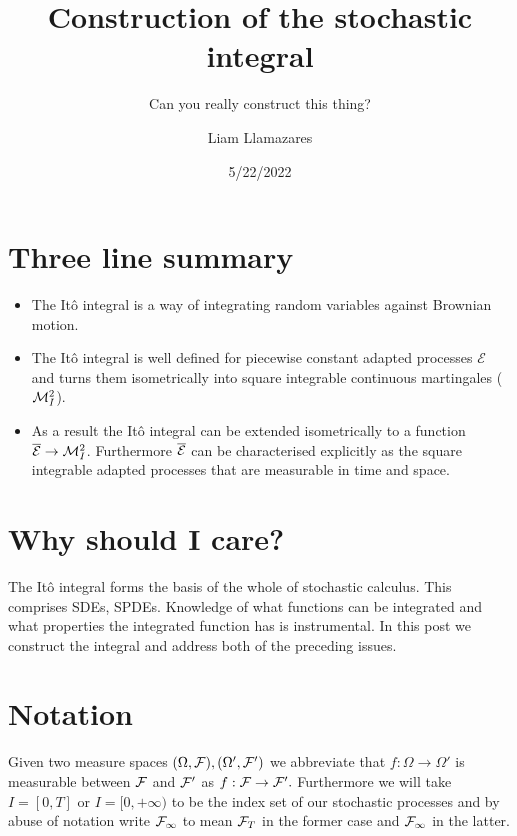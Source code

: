 \documentclass[
    a4paper,
    DIV=14,
    abstract=true,
    numbers=noenddot
]{scrartcl}
\begin{document}
\title{Construction of the stochastic integral}
\subtitle{Can you really construct this thing?}
\author{Liam Llamazares}
\date{5/22/2022}
\maketitle
\section{Three line summary}
\begin{itemize}
	\item The Itô integral is a way of integrating random variables against Brownian motion.
	\item The Itô integral is well defined for piecewise constant adapted processes $\mathcal{E}$ and turns them isometrically into square integrable continuous martingales ($\mathcal{M}_I^2$).
	\item As a result the Itô integral can be extended isometrically to a function $\overline{\mathcal{E}}\to \mathcal{M}_I^2$. Furthermore $\overline{\mathcal{E}}$ can be characterised explicitly as the square integrable adapted processes that are measurable in time and space. \end{itemize}
\section{Why should I care?}
The Itô integral forms the basis of the whole of stochastic calculus. This comprises SDEs, SPDEs. Knowledge of what functions can be integrated and what properties the integrated function has is instrumental. In this post we construct the integral and address both of the preceding issues.
\section{Notation}
Given two measure spaces $(\Omega,\mathcal{F}),(\Omega',\mathcal{F}')$ we abbreviate that $f:\Omega\to\Omega'$ is measurable between $\mathcal{F}$ and $\mathcal{F}'$ as
$f:\mathcal{F}\to\mathcal{F}'.$ Furthermore we will take $I=[0,T]$ or $I=[0,+\infty)$ to be the index set of our stochastic processes and by abuse of notation write $\mathcal{F}_\infty$ to mean $\mathcal{F}_T$ in the former case and $\mathcal{F}_\infty$ in the latter.
\end{document}
